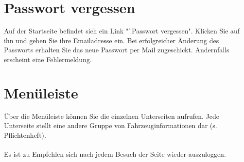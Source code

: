 \documentclass[fontsize = 12pt, paper = a4]{scrreprt}
\begin{document}
\section{Passwort vergessen}

Auf der Startseite befindet sich ein Link "`Passwort vergessen". Klicken Sie auf ihn und geben Sie ihre Emailadresse ein. Bei erfolgreicher Änderung des Passworts erhalten Sie das neue Passwort per Mail zugeschickt. Andernfalls erscheint eine Fehlermeldung.

\section{Menüleiste}

Über die Menüleiste können Sie die einzelnen Unterseiten aufrufen. Jede Unterseite stellt eine andere Gruppe von Fahrzeuginformationen dar (s. Pflichtenheft). \\ \\

Es ist zu Empfehlen sich nach jedem Besuch der Seite wieder auszuloggen.
\end{document}
